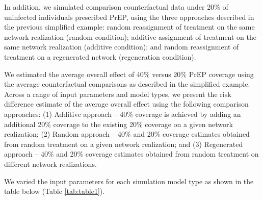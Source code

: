 \documentclass{article}
\theoremstyle{definition}
\begin{document}
In addition, we simulated comparison counterfactual data under 20\% of uninfected individuals prescribed PrEP, using the three approaches described in the previous simplified example: random reassignment of treatment on the same network realization (random condition); additive assignment of treatment on the same network realization (additive condition); and random reassignment of treatment on a regenerated network (regeneration condition). 

We estimated the average overall effect of 40\% versus 20\% PrEP coverage using the average counterfactual comparisons as described in the simplified example. Across a range of input parameters and model types, we present the risk difference estimate of the average overall effect using the following comparison approaches: (1) Additive approach -- 40\% coverage is achieved by adding an additional 20\% coverage to the existing 20\% coverage on a given network realization; (2) Random approach -- 40\% and 20\% coverage estimates obtained from random treatment on a given network realization; and (3) Regenerated approach -- 40\% and 20\% coverage estimates obtained from random treatment on different network realizations.

We varied the input parameters for each simulation model type as shown in the table below (Table \ref{tab:table1}).
\end{document}
